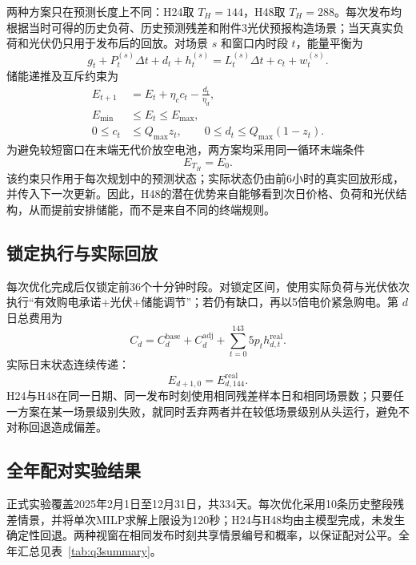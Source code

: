 \documentclass[UTF8,12pt,a4paper]{ctexart}
\begin{document}
两种方案只在预测长度上不同：H24取 $T_H=144$，H48取 $T_H=288$。每次发布均根据当时可得的历史负荷、历史预测残差和附件3光伏预报构造场景；当天真实负荷和光伏仍只用于发布后的回放。对场景 $s$ 和窗口内时段 $t$，能量平衡为
\begin{equation}
g_t+P_t^{(s)}\Delta t+d_t+h_t^{(s)}
=L_t^{(s)}\Delta t+c_t+w_t^{(s)}.
\end{equation}
储能递推及互斥约束为
\begin{align}
E_{t+1}&=E_t+\eta_cc_t-\frac{d_t}{\eta_d},\\
E_{\min}&\le E_t\le E_{\max},\\
0\le c_t&\le Q_{\max}z_t,\qquad
0\le d_t\le Q_{\max}(1-z_t).
\end{align}
为避免较短窗口在末端无代价放空电池，两方案均采用同一循环末端条件
\begin{equation}
E_{T_H}=E_0.
\end{equation}
该约束只作用于每次规划中的预测状态；实际状态仍由前6小时的真实回放形成，并传入下一次更新。因此，H48的潜在优势来自能够看到次日价格、负荷和光伏结构，从而提前安排储能，而不是来自不同的终端规则。

\subsection{锁定执行与实际回放}

每次优化完成后仅锁定前36个十分钟时段。对锁定区间，使用实际负荷与光伏依次执行“有效购电承诺+光伏+储能调节”；若仍有缺口，再以5倍电价紧急购电。第 $d$ 日总费用为
\begin{equation}
C_d=C_d^{\mathrm{base}}+C_d^{\mathrm{adj}}
+\sum_{t=0}^{143}5p_th_{d,t}^{\mathrm{real}}.
\end{equation}
实际日末状态连续传递：
\begin{equation}
E_{d+1,0}=E_{d,144}^{\mathrm{real}}.
\end{equation}
H24与H48在同一日期、同一发布时刻使用相同残差样本日和相同场景数；只要任一方案在某一场景级别失败，就同时丢弃两者并在较低场景级别从头运行，避免不对称回退造成偏差。

\subsection{全年配对实验结果}

正式实验覆盖2025年2月1日至12月31日，共334天。每次优化采用10条历史整段残差情景，并将单次MILP求解上限设为120秒；H24与H48均由主模型完成，未发生确定性回退。两种视窗在相同发布时刻共享情景编号和概率，以保证配对公平。全年汇总见表~\ref{tab:q3summary}。
\end{document}
